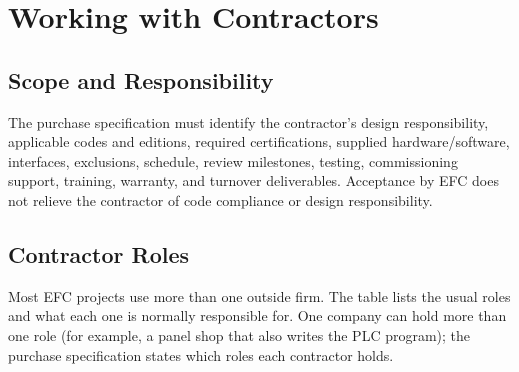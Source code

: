 \chapter{Working with Contractors}
\section{Scope and Responsibility}
The purchase specification must identify the contractor's design responsibility, applicable codes and editions, required certifications, supplied hardware/software, interfaces, exclusions, schedule, review milestones, testing, commissioning support, training, warranty, and turnover deliverables. Acceptance by EFC does not relieve the contractor of code compliance or design responsibility.

\section[Contractor Roles]{Contractor Roles \newmark}\label{sec:contractor-roles}
Most EFC projects use more than one outside firm. The table lists the usual roles and what each one is normally responsible for. One company can hold more than one role (for example, a panel shop that also writes the PLC program); the purchase specification states which roles each contractor holds.

